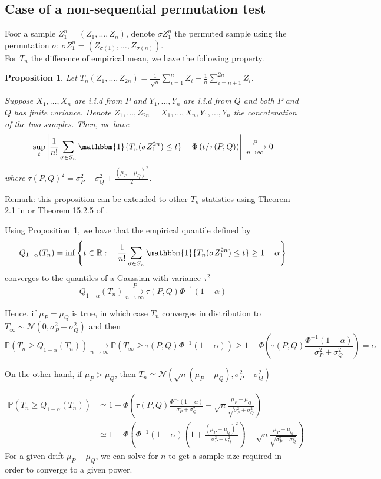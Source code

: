 \documentclass{article}
\theoremstyle{plain}
\newtheorem{Proposition}{Proposition}
\theoremstyle{remark}
\renewcommand{\P}{\mathbb{P}}
\newcommand{\R}{\mathbb{R}}
\newcommand{\1}{\mathbbm{1}}
\numberwithin{equation}{section}
\begin{document}
\subsection{Case of a non-sequential permutation test}

Foor a sample $Z_1^n=(Z_1,\dots,Z_n)$, denote $\sigma Z_1^n$ the permuted sample using the permutation $\sigma$: $\sigma Z_1^n=(Z_{\sigma(1)},\dots,Z_{\sigma(n)})$.\\
For $T_n$ the difference of empirical mean, we have the following property.

\begin{Proposition}\label{prop:asym_perm_test}
Let $T_n(Z_1,\dots,Z_{2n})=\frac{1}{\sqrt{n}}\sum_{i=1}^n Z_i -\frac{1}{n}\sum_{i=n+1}^{2n} Z_i$. 

Suppose $X_1,\dots,X_n$ are i.i.d from $P$ and $Y_1,\dots,Y_n$ are i.i.d from $Q$ and both $P$ and $Q$ has finite variance. Denote $Z_1,\dots,Z_{2n}=X_1,\dots,X_n, Y_1,\dots,Y_n$ the concatenation of the two samples. Then, we have
$$\sup_{t}\left|\frac{1}{n!}\sum_{\sigma \in S_n} \1\{T_n(\sigma Z_{1}^{2n}) \le t\}- \Phi\left(t/\tau(P,Q) \right)\right|\xrightarrow[n \to \infty]{P} 0$$
where $\tau(P,Q)^2=\sigma_P^2+\sigma_Q^2+\frac{(\mu_P- \mu_Q)^2}{2} $. 
\end{Proposition}
Remark: this proposition can be extended to other $T_n$ statistics using Theorem 2.1 in \cite{Chung_2013} or Theorem 15.2.5 of \cite{lehmann2005testing}.

Using Proposition~\ref{prop:asym_perm_test}, we have that the empirical quantile defined by 
$$Q_{1-\alpha}(T_n) = \inf\left\{t \in \R:\quad \frac{1}{n!}\sum_{\sigma \in S_n} \1\{T_n(\sigma Z_{1}^{2n}) \le t\} \ge 1-\alpha\right\} $$
converges to the quantiles of a Gaussian with variance $\tau^2$
$$Q_{1-\alpha}(T_n)\xrightarrow[n \to \infty]{P} \tau(P,Q)\Phi^{-1}(1-\alpha) $$

 Hence, if $\mu_P = \mu_Q$ is true, in which case $T_n$ converges in distribution to $T_\infty\sim \mathcal{N}(0,\sigma_P^2+\sigma_Q^2 )$ and then
$$\P\left( T_n \ge Q_{1-\alpha}(T_n)\right) \xrightarrow[n \to \infty]{} \P(T_\infty\ge \tau(P,Q)\Phi^{-1}(1-\alpha)) \ge  1-\Phi\left(\tau(P,Q)\frac{\Phi^{-1}(1-\alpha)}{\sigma_P^2+\sigma_Q^2 } \right)=\alpha  $$

On the other hand, if $\mu_P > \mu_Q$, then $T_n \simeq \mathcal{N}(\sqrt{n}(\mu_P-\mu_Q),\sigma_P^2+\sigma_Q^2 ) $

\begin{align*}
\P\left( T_n \ge Q_{1-\alpha}(T_n)\right)&\simeq  1-\Phi\left(\tau(P,Q)\frac{\Phi^{-1}(1-\alpha)}{\sigma_P^2+\sigma_Q^2 }-  \sqrt{n}\frac{\mu_P-\mu_Q}{\sqrt{\sigma_P^2+\sigma_Q^2}} \right)  \\
&\simeq  1-\Phi\left(\Phi^{-1}(1-\alpha)\left(1+\frac{(\mu_P-\mu_Q)^2}{\sigma_P^2+\sigma_Q^2 }\right)-  \sqrt{n}\frac{\mu_P-\mu_Q}{\sqrt{\sigma_P^2+\sigma_Q^2}} \right)
\end{align*}
For a given drift $\mu_P-\mu_Q$, we can solve for $n$ to get a sample size required in order to converge to a given power.
\end{document}
